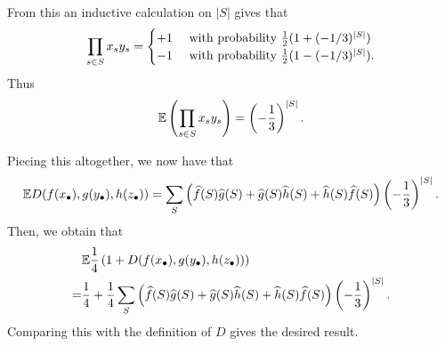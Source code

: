 \begin{problem}
\begin{sol}
\begin{itemize}
		From this an inductive calculation on $|S|$ gives that
		\[
			\prod_{s \in S} x_sy_s
			=
			\begin{cases}
				+1 & \text{ with probability } \frac{1}{2}(1+(-1/3)^{|S|}) \\
				-1 & \text{ with probability } \frac{1}{2}(1-(-1/3)^{|S|}).
			\end{cases}
		\]
		Thus
		\[ \mathbb E \left( \prod_{s \in S} x_sy_s \right) = \left( -\frac13 \right)^{|S|}.  \]
	\end{itemize}
	Piecing this altogether, we now have that
	\[
		\mathbb E D(f(x_\bullet), g(y_\bullet), h(z_\bullet))
		=
		\sum_S \left( \widehat f(S) \widehat g(S) + \widehat g(S) \widehat h(S) + \widehat h(S) \widehat f(S) \right)
		\left( -\frac13 \right)^{|S|}.
	\]
	Then, we obtain that
	\begin{align*}
		&\mathbb E \frac14 \left( 1 + D(f(x_\bullet), g(y_\bullet), h(z_\bullet)) \right) \\
		=& \frac14 + \frac14\sum_S
		\left( \widehat f(S) \widehat g(S) + \widehat g(S) \widehat h(S) + \widehat h(S) \widehat f(S) \right)
		\left( -\frac13 \right)^{|S|}.
	\end{align*}
	Comparing this with the definition of $D$ gives the desired result.
	\end{sol}
\end{problem}
